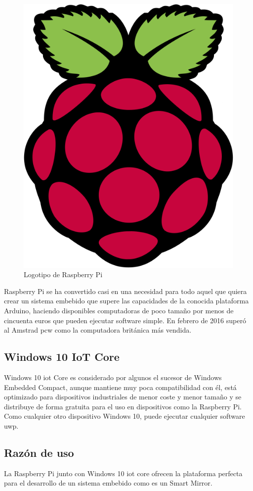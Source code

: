 \begin{figure}[!htbp]
	\centering
	\includegraphics[scale=0.20]{fig/raspberry_logo}
	\caption{Logotipo de Raspberry Pi}
\end{figure}

\FloatBarrier

Raspberry Pi se ha convertido casi en una necesidad para todo aquel que quiera crear un sistema embebido que supere las capacidades de la conocida plataforma Arduino, haciendo disponibles computadoras de poco tamaño por menos de cincuenta euros que pueden ejecutar software simple. En febrero de 2016 superó al Amstrad \acrshort{pcw} como la computadora británica más vendida.

\subsection{Windows 10 IoT Core}

Windows 10 \acrshort{iot} Core es considerado por algunos el sucesor de Windows Embedded Compact, aunque mantiene muy poca compatibilidad con él, está optimizado para dispositivos industriales de menor coste y menor tamaño y se distribuye de forma gratuita para el uso en dispositivos como la Raspberry Pi. Como cualquier otro dispositivo Windows 10, puede ejecutar cualquier software \acrshort{uwp}.

\subsection{Razón de uso}

La Raspberry Pi junto con Windows 10 \acrshort{iot} core ofrecen la plataforma perfecta para el desarrollo de un sistema embebido como es un Smart Mirror.